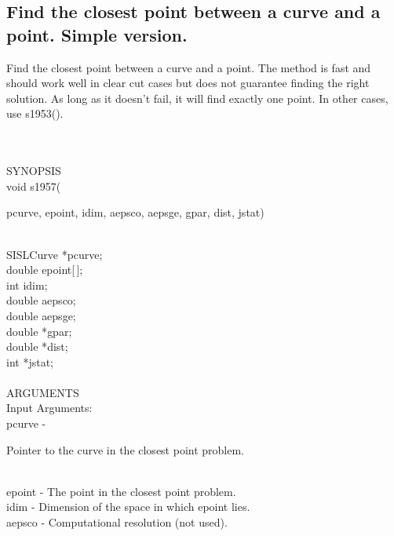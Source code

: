 \subsection{Find the closest point between a curve and a point. Simple version.}
\begin{minipg1}
  Find the closest point between a curve and a point.
  The method is fast and should work well in clear cut cases but does not
  guarantee finding the right solution. As long as it doesn't fail, it
  will find exactly one point.  In other cases, use s1953().
\end{minipg1}\\ \\
SYNOPSIS\\
        \>void s1957(\begin{minipg3}
          {\fov pcurve}, {\fov epoint}, {\fov idim}, {\fov aepsco}, {\fov aepsge}, {\fov gpar}, {\fov dist}, {\fov jstat})
        \end{minipg3}\\[0.3ex]
        \>\>    SISLCurve \>  *{\fov pcurve};\\
        \>\>    double    \>  {\fov epoint}[\,];\\
        \>\>    int       \>  {\fov idim};\\
        \>\>    double    \>  {\fov aepsco};\\
        \>\>    double    \>  {\fov aepsge};\\
        \>\>    double    \>  *{\fov gpar};\\
        \>\>    double    \>  *{\fov dist};\\
        \>\>    int       \>  *{\fov jstat};\\
\\
ARGUMENTS\\
        \>Input Arguments:\\
        \>\>    {\fov pcurve} \> - \>
        \begin{minipg2}
          Pointer to the curve in the closest point problem.
        \end{minipg2}\\[0.8ex]
        \>\>    {\fov epoint} \> - \> The point in the closest point problem.\\
        \>\>    {\fov idim}   \> - \> Dimension of the space in which
                                      {\fov epoint} lies.\\
        \>\>    {\fov aepsco} \> - \> Computational resolution (not used).\\
